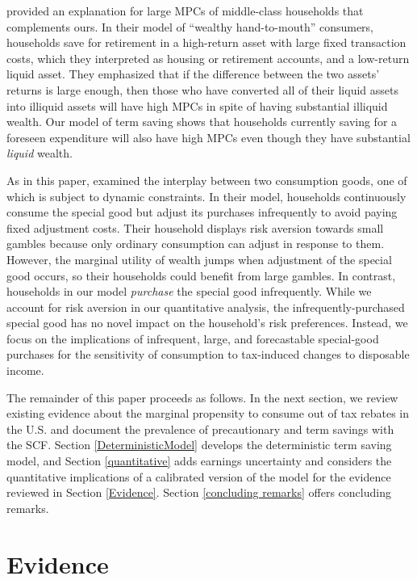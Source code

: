 \documentclass[fleqccn,12pt]{article}
\begin{document}
\cite{ecta2014KaplanViolante} provided an explanation for large MPCs of middle-class households that complements ours. In their model of ``wealthy hand-to-mouth'' consumers, households save for retirement in a high-return asset with large fixed transaction costs, which they interpreted as housing or retirement accounts, and a low-return liquid asset. They emphasized that if the difference between the two assets' returns is large enough, then those who have converted all of their liquid assets into illiquid assets will have high MPCs in spite of having substantial illiquid wealth. Our model of term saving shows that households currently saving for a foreseen expenditure will also have high MPCs even though they have substantial \emph{liquid} wealth. 

As in this paper, \citet{qje2007ChettySzeidl}  examined the interplay between two consumption goods, one of which is subject to dynamic constraints. In their model, households continuously consume the special good but adjust its purchases infrequently to avoid paying fixed adjustment costs.  Their household displays risk aversion towards small gambles because only ordinary consumption can adjust in response to them. However, the marginal utility of wealth jumps when adjustment of the special good occurs, so their households could benefit from large gambles.  In contrast, households in our model \emph{purchase} the special good infrequently. While we account for risk aversion in our quantitative analysis, the infrequently-purchased special good has no novel impact on the household's risk preferences. Instead, we focus on the implications of infrequent, large, and forecastable special-good purchases for the sensitivity of consumption to tax-induced changes to disposable income.

The remainder of this paper proceeds as follows. In the next section, we review existing evidence about the marginal propensity to consume out of tax rebates in the U.S. and document the prevalence of precautionary and term savings with the SCF.  Section \ref{DeterministicModel} develops the deterministic term saving model, and Section \ref{quantitative} adds earnings uncertainty and considers the quantitative implications of a calibrated version of the model for the evidence reviewed in Section \ref{Evidence}. Section \ref{concluding remarks} offers concluding remarks.

\section{Evidence\label{Evidence}}
\end{document}
